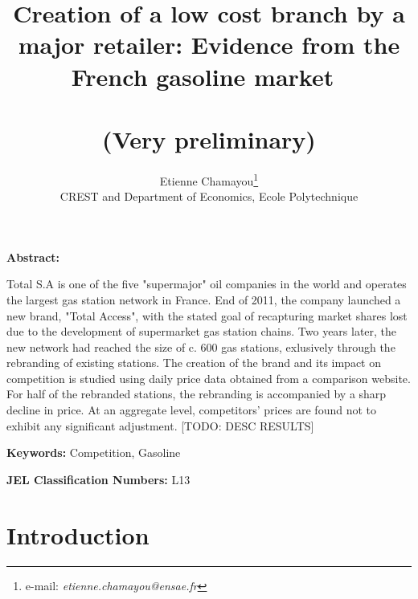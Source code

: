 \documentclass[11pt]{article}
\begin{document}
\title{Creation of a low cost branch by a major retailer: Evidence from the French gasoline market\ \\ \ \\(Very preliminary)}
\author{Etienne Chamayou\thanks{e-mail:
\textit{etienne.chamayou@ensae.fr}}\medskip\\{\normalsize CREST and Department of Economics, Ecole Polytechnique }}
\maketitle

\sloppy%

\onehalfspacing

\textbf{Abstract:}

Total S.A is one of the five "supermajor" oil companies in the world and operates the largest gas station network in France. End of 2011, the company launched a new brand, "Total Access", with the stated goal of recapturing market shares lost due to the development of supermarket gas station chains. Two years later, the new network had reached the size of c. 600 gas stations, exlusively through the rebranding of existing stations. The creation of the brand and its impact on competition is studied using daily price data obtained from a comparison website. For half of the rebranded stations, the rebranding is accompanied by a sharp decline in price. At an aggregate level, competitors' prices are found not to exhibit any significant adjustment. [TODO: DESC RESULTS]

\strut

\textbf{Keywords:} Competition, Gasoline

\strut

\textbf{JEL Classification Numbers:} L13

\pagebreak%

\section{Introduction}
\end{document}
